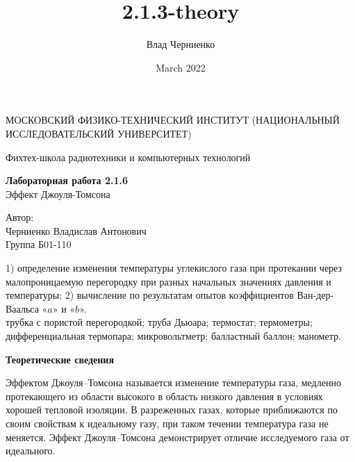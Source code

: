\documentclass[a4paper, 12pt]{article}
\title{2.1.3-theory}
\author{Влад Черниенко}
\date{March 2022}
\begin{document}
    \begin{titlepage}
    
        \begin{center}
            {\large МОСКОВСКИЙ ФИЗИКО-ТЕХНИЧЕСКИЙ ИНСТИТУТ (НАЦИОНАЛЬНЫЙ ИССЛЕДОВАТЕЛЬСКИЙ УНИВЕРСИТЕТ)}
        \end{center}
        \begin{center}
            {\large Фихтех-школа радиотехники и компьютерных технологий}
        \end{center}
        
        \vspace{4.5cm}
        
        {\huge
            \begin{center}
                {\bf Лабораторная работа 2.1.6} \\
                Эффект Джоуля-Томсона
            \end{center}
        }
        
        \vspace{12cm}
        
        \begin{flushright}
            {\LARGE Автор: \\ Черниенко Владислав Антонович \\ \vspace{0.2cm} Группа Б01-110}
        \end{flushright}
        
    \end{titlepage}
    
    
     1) определение изменения температуры углекислого газа при протекании через малопроницаемую перегородку при разных начальных значениях давления и температуры; 2) вычисление по результатам опытов коэффициентов Ван-дер-Ваальса «$a$» и «$b$».\\
    
     трубка с пористой перегородкой; труба Дьюара; термостат; термометры; дифференциальная термопара; микровольтметр; балластный баллон; манометр.\\
    
    \begin{flushleft}
        {\Large {\bf Теоретические сведения}}
    \end{flushleft}
    
    Эффектом Джоуля–Томсона называется изменение температуры газа, медленно протекающего из области высокого в область низкого давления в условиях хорошей тепловой изоляции. В разреженных газах, которые приближаются по своим свойствам к идеальному газу, при таком течении температура газа не меняется. Эффект Джоуля–Томсона демонстрирует отличие исследуемого газа от идеального.
    
\end{document}
